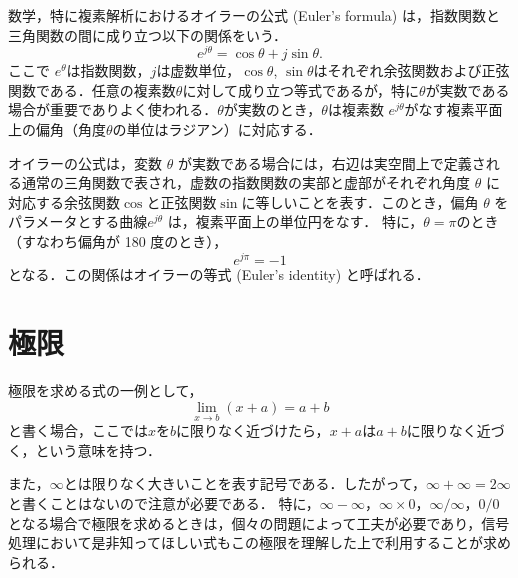 数学，特に複素解析におけるオイラーの公式 (Euler's formula) は，指数関数と三角関数の間に成り立つ以下の関係をいう．
\begin{equation}
{\displaystyle e^{j\theta }=\cos \theta +j\sin \theta .
}
\end{equation}
ここで $e^{\theta}$は指数関数，$j$は虚数単位，$\cos \theta$, $\sin \theta$はそれぞれ余弦関数および正弦関数である．任意の複素数$\theta$に対して成り立つ等式であるが，特に$\theta$が実数である場合が重要でありよく使われる．$\theta$が実数のとき，$\theta$は複素数 $e^{j\theta}$がなす複素平面上の偏角（角度$\theta$の単位はラジアン）に対応する．

オイラーの公式は，変数 $\theta$ が実数である場合には，右辺は実空間上で定義される通常の三角関数で表され，虚数の指数関数の実部と虚部がそれぞれ角度 $\theta$ に対応する余弦関数$\cos$と正弦関数$\sin$に等しいことを表す．このとき，偏角 $\theta$ をパラメータとする曲線$e^{j\theta}$ は，複素平面上の単位円をなす． 特に，$\theta = \pi$のとき（すなわち偏角が 180 度のとき），
\begin{equation}
{\displaystyle e^{j\pi }=-1}
\end{equation}
となる．この関係はオイラーの等式 (Euler's identity) と呼ばれる．



\section{極限}

極限を求める式の一例として，
\begin{equation}
\lim_{x \rightarrow b}(x+a)=a+b
\end{equation}
と書く場合，ここでは$x$を$b$に限りなく近づけたら，$x+a$は$a+b$に限りなく近づく，という意味を持つ．

また，$\infty$とは限りなく大きいことを表す記号である．したがって，$\infty + \infty = 2\infty$と書くことはないので注意が必要である．
%
特に，$\infty - \infty$，$\infty \times 0$，$\infty / \infty$，$0/0$となる場合で極限を求めるときは，個々の問題によって工夫が必要であり，信号処理において是非知ってほしい式もこの極限を理解した上で利用することが求められる．

